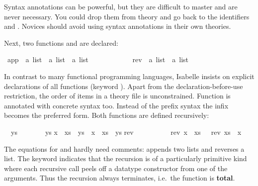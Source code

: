 \begin{isabellebody}
\begin{isamarkuptext}
\begin{warn}
  Syntax annotations can be powerful, but they are difficult to master and 
  are never necessary.  You
  could drop them from theory  and go back to the identifiers
   and .
  Novices should avoid using
  syntax annotations in their own theories.
\end{warn}
Next, two functions  and  are declared:%
\end{isamarkuptext}%
\isamarkuptrue%
\isamarkupfalse%
\ app\ {\isacharcolon}{\isacharcolon}\ {\isachardoublequoteopen}{\isacharprime}a\ list\ {\isasymRightarrow}\ {\isacharprime}a\ list\ {\isasymRightarrow}\ {\isacharprime}a\ list{\isachardoublequoteclose}\ \ \ {\isacharparenleft}\ {\isachardoublequoteopen}{\isacharat}{\isachardoublequoteclose}\ {}{}{\isacharparenright}\isanewline
\ \ \ \ \ \ \ rev\ {\isacharcolon}{\isacharcolon}\ {\isachardoublequoteopen}{\isacharprime}a\ list\ {\isasymRightarrow}\ {\isacharprime}a\ list{\isachardoublequoteclose}%
\begin{isamarkuptext}%
\noindent
In contrast to many functional programming languages,
Isabelle insists on explicit declarations of all functions
(keyword ).  Apart from the declaration-before-use
restriction, the order of items in a theory file is unconstrained. Function
 is annotated with concrete syntax too. Instead of the
prefix syntax  the infix
 becomes the preferred
form. Both functions are defined recursively:%
\end{isamarkuptext}%
\isamarkuptrue%
\isamarkupfalse%
\isanewline
{\isachardoublequoteopen}{\isacharbrackleft}{\isacharbrackright}\ {\isacharat}\ ys\ \ \ \ \ \ \ {\isacharequal}\ ys{\isachardoublequoteclose}\isanewline
{\isachardoublequoteopen}{\isacharparenleft}x\ {\isacharhash}\ xs{\isacharparenright}\ {\isacharat}\ ys\ {\isacharequal}\ x\ {\isacharhash}\ {\isacharparenleft}xs\ {\isacharat}\ ys{\isacharparenright}{\isachardoublequoteclose}\isanewline
\isanewline
{}\isamarkupfalse%
\isanewline
{\isachardoublequoteopen}rev\ {\isacharbrackleft}{\isacharbrackright}\ \ \ \ \ \ \ \ {\isacharequal}\ {\isacharbrackleft}{\isacharbrackright}{\isachardoublequoteclose}\isanewline
{\isachardoublequoteopen}rev\ {\isacharparenleft}x\ {\isacharhash}\ xs{\isacharparenright}\ \ {\isacharequal}\ {\isacharparenleft}rev\ xs{\isacharparenright}\ {\isacharat}\ {\isacharparenleft}x\ {\isacharhash}\ {\isacharbrackleft}{\isacharbrackright}{\isacharparenright}{\isachardoublequoteclose}%
\begin{isamarkuptext}%
\noindent{}
The equations for  and  hardly need comments:
 appends two lists and  reverses a list.  The
keyword  indicates that the recursion is
of a particularly primitive kind where each recursive call peels off a datatype
constructor from one of the arguments.  Thus the
recursion always terminates, i.e.\ the function is \textbf{total}.


\end{isamarkuptext}
\end{isabellebody}
